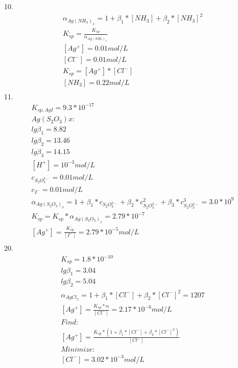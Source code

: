 \documentclass{article}
\begin{document}
10.\begin{equation}
    \begin{multlined}
        \alpha_{Ag(NH_3)_x} = 1 + \beta_1*[NH_3] + \beta_2*[NH_3]^2\\
        K^,_{sp} = \frac{K_{sp}}{\alpha_{Ag(NH_3)_x}}\\
        [Ag^+] = 0.01 mol/L\\
        [Cl^-] = 0.01 mol/L\\
        K^,_{sp} = [Ag^+]*[Cl^-]\\
        [NH_3] = 0.22 mol/L\\
    \end{multlined}
\end{equation}
11.\begin{equation}
    \begin{multlined}
        K_{sp, AgI} = 9.3*10^{-17}\\
        Ag(S_2O_3)x:\\
        lg\beta_1 = 8.82\\
        lg\beta_2 = 13.46\\
        lg\beta_3 = 14.15\\
        [H^+] = 10^{-3} mol/L\\
        c_{S_2O_3^{2-}} = 0.01 mol/L\\
        c_{I^-} = 0.01 mol/L\\
        \alpha_{Ag(S_2O_3)_x} = 1 + \beta_1*c_{S_2O_3^{2-}} + \beta_2*c_{S_2O_3^{2-}}^2 + \beta_3*c_{S_2O_3^{2-}}^3 = 3.0 * 10^9\\
        K^,_{sp} = K_{sp}*\alpha_{Ag(S_2O_3)_x} = 2.79*10^{-7}\\
        [Ag^+] = \frac{K^,_{sp}}{[I^-]} = 2.79*10^{-5} mol/L\\
    \end{multlined}
\end{equation}
20.\begin{equation}
    \begin{multlined}
        K_{sp} = 1.8*10^{-10}\\
        lg\beta_1 = 3.04\\
        lg\beta_2 = 5.04\\
        \alpha_{AgCl_x} = 1 + \beta_1*[Cl^-] + \beta_2*[Cl^-]^2 = 1207\\
        [Ag^+] = \frac{K_{sp}*\alpha}{[Cl^-]} = 2.17*10^{-6} mol/L\\
        Find:\\
        [Ag^+] = \frac{K_{sp}*(1 + \beta_1*[Cl^-] + \beta_2*[Cl^-]^2)}{[Cl^-]}\\
        Minimize:\\
        [Cl^-] = 3.02*10^{-3} mol/L\\
    \end{multlined}
\end{equation}
\end{document}
